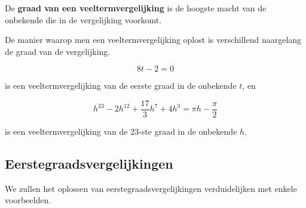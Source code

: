 \begin{definitie}
	De {\bf graad van een veeltermvergelijking} is de hoogste macht van de onbekende die in de vergelijking voorkomt.
\end{definitie} De manier waarop men een veeltermvergelijking oplost is verschillend naargelang de graad van de vergelijking.\\
\begin{voorbeeld}
	

\[ 8t-2=0 \]

is een veeltermvergelijking van de eerste graad in de onbekende $t$, en

\[ h^{23} -2h^{12} + \frac{17}{3} h^7 + 4h^3 = \pi h -\frac{\pi}{2} \]

is een veeltermvergelijking van de $23$-ste graad in de onbekende $h$.\\

\end{voorbeeld}

\subsection{Eerstegraadsvergelijkingen}

We zullen het oplossen van eerstegraadsvergelijkingen verduidelijken met enkele voorbeelden.


